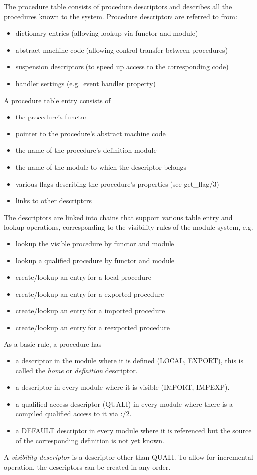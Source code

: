 The procedure table consists of procedure descriptors and describes
all the procedures known to the system.  Procedure descriptors are
referred to from:
\begin{itemize}
\item dictionary entries (allowing lookup via functor and module)
\item abstract machine code (allowing control transfer between procedures)
\item suspension descriptors (to speed up access to the corresponding code)
\item handler settings (e.g.\ event handler property)
\end{itemize}
A procedure table entry consists of
\begin{itemize}
\item the procedure's functor
\item pointer to the procedure's abstract machine code
\item the name of the procedure's definition module 
\item the name of the module to which the descriptor belongs
\item various flags describing the procedure's properties (see get_flag/3)
\item links to other descriptors
\end{itemize}
The descriptors are linked into chains that support various table entry
and lookup operations, corresponding to the visibility  rules of the
module system, e.g.
\begin{itemize}
\item lookup the visible procedure by functor and module
\item lookup a qualified procedure by functor and module
\item create/lookup an entry for a local procedure
\item create/lookup an entry for a exported procedure
\item create/lookup an entry for a imported procedure
\item create/lookup an entry for a reexported procedure
\end{itemize}
As a basic rule, a procedure has
\begin{itemize}
\item a descriptor in the module where it is defined (LOCAL, EXPORT),
	this is called the {\em home} or {\em definition} descriptor.
\item a descriptor in every module where it is visible (IMPORT, IMPEXP).
\item a qualified  access descriptor (QUALI) in every module where
    there is a compiled qualified access to it via :/2.
\item a DEFAULT descriptor in every module where it is referenced but the
    source of the corresponding definition is not yet known.
\end{itemize}
A {\em visibility descriptor} is a descriptor other than QUALI.
To allow for incremental operation, the descriptors can be created
in any order.

